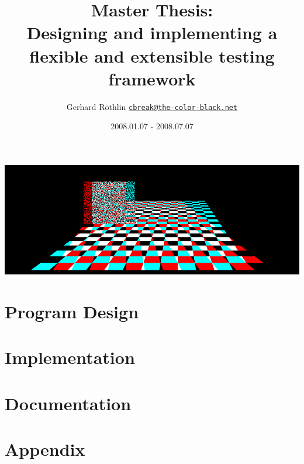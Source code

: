 \documentclass[12pt,twoside,bibtotoc]{scrartcl}
\title{Master Thesis: \mytitle\\
{\large Designing and implementing a flexible and extensible testing framework}}
\author{\normalsize Gerhard R\"othlin 
{\texttt{\href{mailto:cbreak@the-color-black.net}{cbreak@the-color-black.net}}}}
\date{2008.01.07 - 2008.07.07}
\begin{document}
\maketitle

\begin{center}
\includegraphics[width=15cm,clip,trim=0cm 0cm 0cm 0cm]{media/title.png}
\end{center}

\begin{multicols}{2}

\end{multicols}
\clearpage

\begin{multicols}{2}
\tableofcontents
\end{multicols}
\clearpage

\begin{multicols}{2}

\end{multicols}
\clearpage

\part{Program Design}
\begin{multicols}{2}


\end{multicols}
\clearpage

\part{Implementation}
\begin{multicols}{2}




\end{multicols}
\clearpage

\part{Documentation}
\begin{multicols}{2}






\end{multicols}
\clearpage

\appendix
\part{Appendix}


\end{document}
